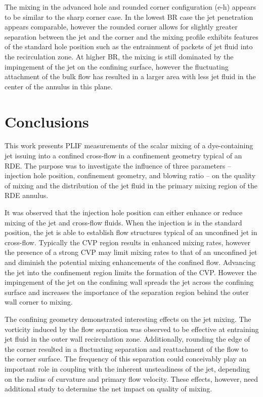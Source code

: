 \documentclass[10pt, twocolumn]{article}
\begin{document}
The mixing in the advanced hole and rounded corner configuration (e-h) appears to be similar to the sharp corner case. In the lowest BR case the jet penetration appears comparable, however the rounded corner allows for slightly greater separation between the jet and the corner and the mixing profile exhibits features of the standard hole position such as the entrainment of packets of jet fluid into the recirculation zone. At higher BR, the mixing is still dominated by the impingement of the jet on the confining surface, however the fluctuating attachment of the bulk flow has resulted in a larger area with less jet fluid in the center of the annulus in this plane.

\section*{Conclusions}
This work presents PLIF measurements of the scalar mixing of a dye-containing jet issuing into a confined cross-flow in a confinement geometry typical of an RDE. The purpose was to investigate the influence of three parameters -- injection hole position, confinement geometry, and blowing ratio -- on the quality of mixing and the distribution of the jet fluid in the primary mixing region of the RDE annulus.

It was observed that the injection hole position can either enhance or reduce mixing of the jet and cross-flow fluids. When the injection is in the standard position, the jet is able to establish flow structures typical of an unconfined jet in cross-flow. Typically the CVP region results in enhanced mixing rates, however the presence of a strong CVP may limit mixing rates to that of an unconfined jet and diminish the potential mixing enhancements of the confined flow. Advancing the jet into the confinement region limits the formation of the CVP. However the impingement of the jet on the confining wall spreads the jet across the confining surface and increases the importance of the separation region behind the outer wall corner to mixing.

The confining geometry demonstrated interesting effects on the jet mixing. The vorticity induced by the flow separation was observed to be effective at entraining jet fluid in the outer wall recirculation zone. Additionally, rounding the edge of the corner resulted in a fluctuating separation and reattachment of the flow to the corner surface. The frequency of this separation could conceivably play an important role in coupling with the inherent unsteadiness of the jet, depending on the radius of curvature and primary flow velocity. These effects, however, need additional study to determine the net impact on quality of mixing.
\end{document}
